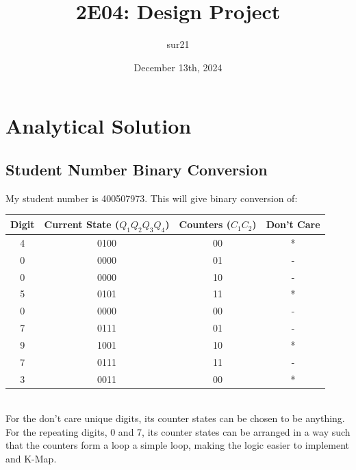 \documentclass{article}
\begin{document}
\title{2E04: Design Project}
\author{sur21}
\date{December 13th, 2024}
\maketitle
\newpage
\tableofcontents
\newpage
\section{Analytical Solution}
\subsection{Student Number Binary Conversion}
My student number is 400507973. This will give binary conversion of:
\\
\begin{tabular}{|c|c|c|c|}
    \hline
    Digit & Current State ($Q_1Q_2Q_3Q_4$) & Counters ($C_1C_2$) & Don't Care\\
    \hline
    4 & 0100 & 00 & * \\
    \hline
    0 & 0000 & 01 & -\\
    \hline
    0 & 0000 & 10 & -\\
    \hline
    5 & 0101 & 11 & * \\
    \hline
    0 & 0000 & 00 & -\\
    \hline
    7 & 0111 & 01 & -\\
    \hline
    9 & 1001 & 10 & * \\
    \hline
    7 & 0111 & 11 & -\\
    \hline
    3 & 0011 & 00 & * \\
    \hline
\end{tabular}
\vspace{0.5\baselineskip}
\\
For the don't care unique digits, its counter states can be chosen to be anything. For the repeating digits, 0 and 7, its counter states can be arranged in a way such that
the counters form a loop a simple loop, making the logic easier to implement and K-Map.
\end{document}
